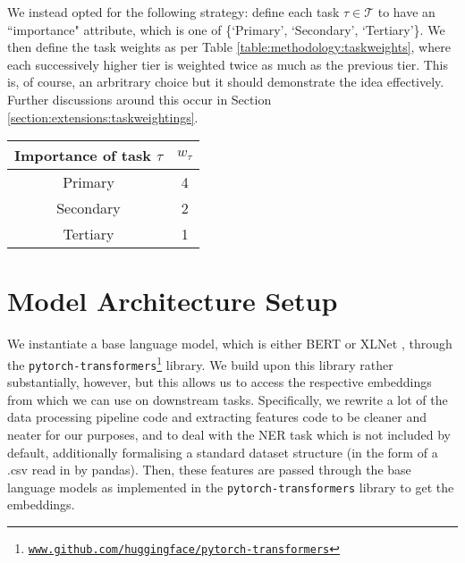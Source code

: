 We instead opted for the following strategy: define each task $\tau \in \mathcal{T}$ to have an ``importance" attribute, which is one of \{`Primary', `Secondary', `Tertiary'\}. We then define the task weights as per Table \ref{table:methodology:taskweights}, where each successively higher tier is weighted twice as much as the previous tier. This is, of course, an arbritrary choice but it should demonstrate the idea effectively. Further discussions around this occur in Section \ref{section:extensions:taskweightings}.

\begin{center}
	\begin{tabular}{||c | c||} 
		\hline
		Importance of task $\tau$ & $w_{\tau}$  \\ [0.5ex] 
		\hline\hline
		Primary & 4 \\ 
		\hline
		Secondary & 2  \\
		\hline
		Tertiary & 1  \\
		\hline
	\end{tabular}
	\label{table:methodology:taskweights}
\end{center}


\section{Model Architecture Setup} \label{section:methodology:modelsetup}
We instantiate a base language model, which is either BERT \cite{Devlin2018} or XLNet \cite{Yang2019}, through the \texttt{pytorch-transformers}\footnote{\href{www.github.com/huggingface/pytorch-transformers}{\texttt{www.github.com/huggingface/pytorch-transformers}}} library. We build upon this library rather substantially, however, but this allows us to access the respective embeddings from which we can use on downstream tasks. Specifically, we rewrite a lot of the data processing pipeline code and extracting features code to be cleaner and neater for our purposes, and to deal with the NER task which is not included by default, additionally formalising a standard dataset structure (in the form of a .csv read in by pandas). Then, these features are passed through the base language models as implemented in the \texttt{pytorch-transformers} library to get the embeddings. 

